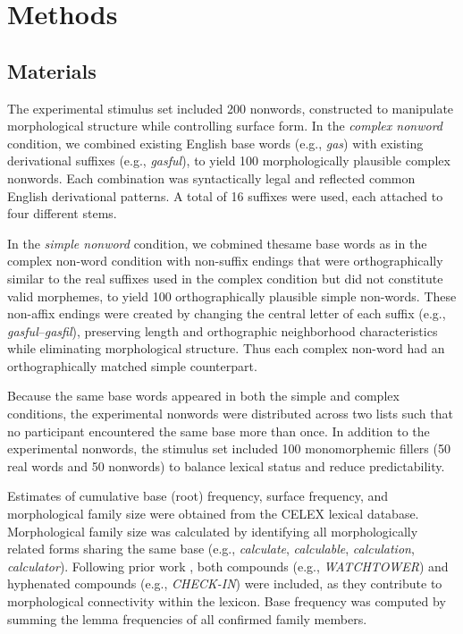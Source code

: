 \documentclass[utf8]{FrontiersinHarvard} %
\begin{document}
\section{Methods}

\subsection{Materials}

The experimental stimulus set included 200 nonwords, constructed to manipulate morphological structure while controlling surface form. In the \textit{complex nonword} condition, we combined existing English base words (e.g., \textit{gas}) with existing derivational suffixes (e.g., \textit{gasful}), to yield 100 morphologically plausible complex nonwords. Each combination was syntactically legal and reflected common English derivational patterns. A total of 16 suffixes were used, each attached to four different stems.

In the \textit{simple nonword} condition, we cobmined thesame base words as in the complex non-word condition  with non-suffix endings that were orthographically similar to the real suffixes used in the complex condition but did not constitute valid morphemes, to yield 100 orthographically plausible simple non-words. These non-affix endings were created by changing the central letter of each suffix (e.g., \textit{gasful}–\textit{gasfil}), preserving length and orthographic neighborhood characteristics while eliminating morphological structure.  Thus each complex non-word had an orthographically matched simple counterpart.

Because the same base words appeared in both the simple and complex conditions, the experimental nonwords were distributed across two lists such that no participant encountered the same base more than once. In addition to the experimental nonwords, the stimulus set included 100 monomorphemic fillers (50 real words and 50 nonwords) to balance lexical status and reduce predictability.

Estimates of cumulative base (root) frequency, surface frequency, and morphological family size were obtained from the CELEX lexical database. Morphological family size was calculated by identifying all morphologically related forms sharing the same base (e.g., \textit{calculate}, \textit{calculable}, \textit{calculation}, \textit{calculator}). Following prior work \citep[e.g.,][]{deJong2001, deJong2003}, both compounds (e.g., \textit{WATCHTOWER}) and hyphenated compounds (e.g., \textit{CHECK-IN}) were included, as they contribute to morphological connectivity within the lexicon. Base frequency was computed by summing the lemma frequencies of all confirmed family members.
\end{document}
